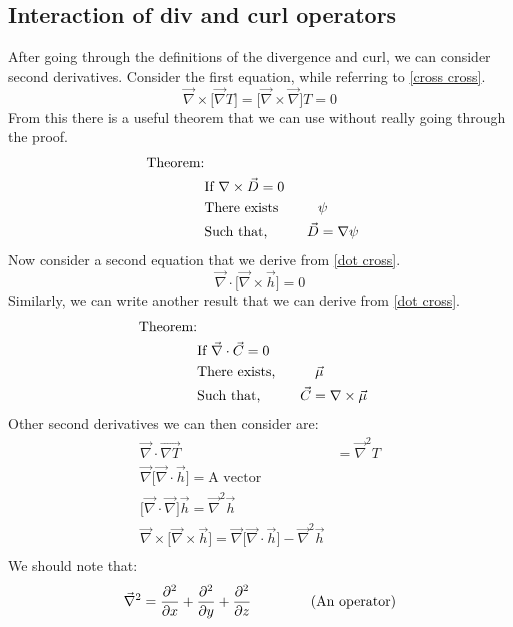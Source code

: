 \subsection{Interaction of div and curl operators}
After going through the definitions of the divergence and curl, we can consider second derivatives. Consider the first equation, while referring to \autoref{cross cross}.
\begin{equation}
	\label{curl grad}
	\vec{\nabla} \times \Big[ \vec{\nabla} T \Big] = \Big[ \vec{\nabla} \times \vec{\nabla} \Big]T = 0
\end{equation}
From this there is a useful theorem that we can use without really going through the proof. 
\begin{align*}
	\text{Theorem:}\\
		&\text{If $\nabla \times \vec{D}$} = 0\\
		&\text{There exists} \hspace{10mm}  \psi\\
		&\text{Such that,} \hspace{10mm} \vec{D} = \nabla \psi
\end{align*}
Now consider a second equation that we derive from \autoref{dot cross}. 
\begin{equation}
	\vec{\nabla} \cdot \Big[ \vec{\nabla} \times \vec{h} \Big] = 0
\end{equation}
Similarly, we can write another result that we can derive from \autoref{dot cross}. 
\begin{align*}
	\label{div curl}
	\text{Theorem:}\\
		&\text{If $\vec{\nabla} \cdot \vec{C}  = 0$}\\
		&\text{There exists,} \hspace{10mm} \vec{\mu}\\
		&\text{Such that,} \hspace{10mm} \vec{C} = \nabla \times \vec{\mu}
\end{align*}
Other second derivatives we can then consider are: 
\begin{align}
	\vec{\nabla} \cdot \vec{\nabla T} &= \vec{\nabla}^{2}T\\
	\vec{\nabla} \Big[ \vec{\nabla} \cdot \vec{h} \Big] = \text{A vector}\\
	\Big[ \vec{\nabla} \cdot \vec{\nabla} \Big]\vec{h} = \vec{\nabla}^{2}\vec{h}\\
	\vec{\nabla} \times \Big[ \vec{\nabla} \times \vec{h} \Big] = \vec{\nabla}\Big[ \vec{\nabla} \cdot \vec{h} \Big] - \vec{\nabla}^{2}\vec{h}\\
\end{align} 
We should note that: 
\begin{equation} 
	\vec{\nabla}^{2} = \frac{\partial^{2}}{\partial x} + \frac{\partial^{2}}{\partial y} + \frac{\partial^{2}}{\partial z} \hspace{15mm} \text{(An operator)}
\end{equation}
